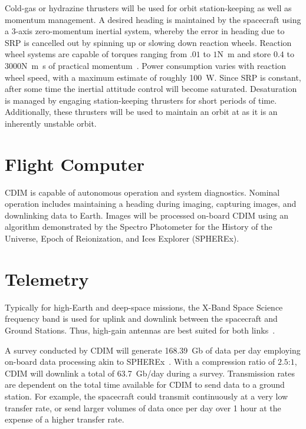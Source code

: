 \documentclass{ws-jai}
\newenvironment{notes}{\color{red}}{}
\begin{document}
Cold-gas or hydrazine thrusters will be used for orbit station-keeping as well as momentum management.
A desired heading is maintained by the spacecraft using a 3-axis zero-momentum inertial system, whereby the error in heading due to SRP is cancelled out by spinning up or slowing down reaction wheels.
Reaction wheel systems are capable of torques ranging from $.01$ to $1$\si{\newton\meter} and store $0.4$ to $3000$\si{\newton\meter\second} of practical momentum~\cite{smad2015}.
Power consumption varies with reaction wheel speed, with a maximum estimate of roughly \SI{100}{\watt}.
Since SRP is constant, after some time the inertial attitude control will become saturated.
Desaturation is managed by engaging station-keeping thrusters for short periods of time.
Additionally, these thrusters will be used to maintain an orbit at \Ltwo{} as it is an inherently unstable orbit.

\section{Flight Computer}
\begin{notes}
  CDIM is capable of autonomous operation and system diagnostics.
  Nominal operation includes maintaining a heading during imaging, capturing images, and downlinking data to Earth.
  Images will be processed on-board CDIM using an algorithm demonstrated by the Spectro Photometer for the History of the Universe, Epoch of Reionization, and Ices Explorer (SPHEREx).
\end{notes}

\section{Telemetry}
\label{sec:telemetry}
Typically for high-Earth and deep-space missions, the X-Band Space Science frequency band is used for uplink and downlink between the spacecraft and Ground Stations.
Thus, high-gain antennas are best suited for both links~\cite{smad2015}.

A survey conducted by CDIM will generate \SI{168.39}{Gb} of data per day employing on-board data processing akin to SPHEREx~\cite{spherexTelemetry2016}.
With a compression ratio of $2.5$:$1$, CDIM will downlink a total of \SI{63.7}{Gb/day} during a survey.
Transmission rates are dependent on the total time available for CDIM to send data to a ground station.
For example, the spacecraft could transmit continuously at a very low transfer rate, or send larger volumes of data once per day over 1 hour at the expense of a higher transfer rate.
\end{document}
